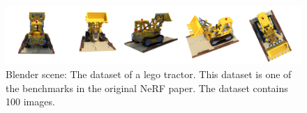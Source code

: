 \begin{figure}[h]
    \centering
    \includegraphics[width=1.0\textwidth]{figures/lego-dataset.png}
    \caption{Blender scene: The dataset of a lego tractor. This dataset is one of the benchmarks in the original NeRF paper. The dataset contains 100 images.}
    \label{fig:lego-dataset}
\end{figure}